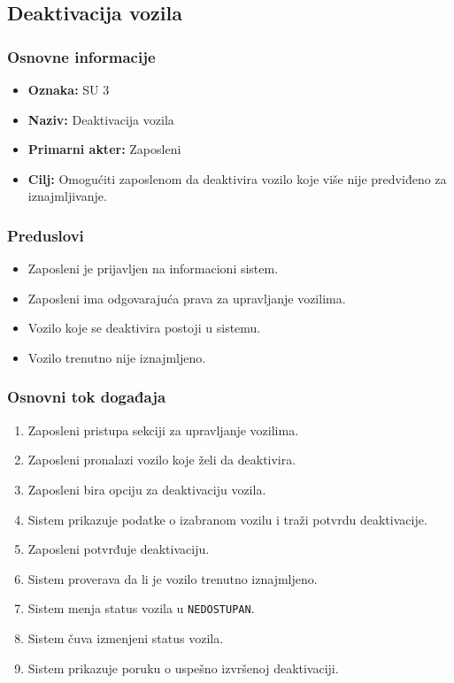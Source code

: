 \subsection{Deaktivacija vozila}

\subsubsection{Osnovne informacije}

\begin{itemize}
    \item \textbf{Oznaka:} SU 3
    \item \textbf{Naziv:} Deaktivacija vozila
    \item \textbf{Primarni akter:} Zaposleni
    \item \textbf{Cilj:} Omogućiti zaposlenom da deaktivira vozilo koje više nije predviđeno za iznajmljivanje.
\end{itemize}

\subsubsection{Preduslovi}

\begin{itemize}
    \item Zaposleni je prijavljen na informacioni sistem.
    \item Zaposleni ima odgovarajuća prava za upravljanje vozilima.
    \item Vozilo koje se deaktivira postoji u sistemu.
    \item Vozilo trenutno nije iznajmljeno.
\end{itemize}

\subsubsection{Osnovni tok događaja}

\begin{enumerate}
    \item Zaposleni pristupa sekciji za upravljanje vozilima.
    \item Zaposleni pronalazi vozilo koje želi da deaktivira.
    \item Zaposleni bira opciju za deaktivaciju vozila.
    \item Sistem prikazuje podatke o izabranom vozilu i traži potvrdu deaktivacije.
    \item Zaposleni potvrđuje deaktivaciju.
    \item Sistem proverava da li je vozilo trenutno iznajmljeno.
    \item Sistem menja status vozila u \texttt{NEDOSTUPAN}.
    \item Sistem čuva izmenjeni status vozila.
    \item Sistem prikazuje poruku o uspešno izvršenoj deaktivaciji.
\end{enumerate}


